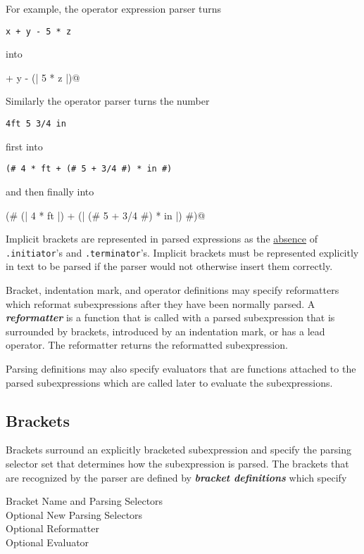 \documentclass[12pt]{article}
\newcommand{\key}[1]{{\bf \em #1}\index{#1}}
\newcommand{\skey}[2]{{\bf \em #1#2}\index{#1}}
\newenvironment{indpar}[1][0.3in]%
	{\begin{list}{}%
		     {\setlength{\itemsep}{0in}%
		      \setlength{\topsep}{0in}%
		      \setlength{\parsep}{1ex}%
		      \setlength{\labelwidth}{#1}%
		      \setlength{\leftmargin}{#1}%
		      \addtolength{\leftmargin}{\labelsep}}%
	 \item}%
	{\end{list}}
\begin{document}
For example, the operator expression parser turns
\begin{center}
\verb|x + y - 5 * z|
\end{center}
into
\begin{center}
\verb@x + y - (| 5 * z |)@
\end{center}
Similarly the operator parser turns the number
\begin{center}
\verb|4ft 5 3/4 in|
\end{center}
first into
\begin{center}
\verb|(# 4 * ft + (# 5 + 3/4 #) * in #)|
\end{center}
and then finally into
\begin{center}
\verb@(# (| 4 * ft |) + (| (# 5 + 3/4 #) * in |) #)@
\end{center}

Implicit brackets are represented in parsed expressions as the
\underline{absence} of \verb|.initiator|'s
and \verb|.terminator|'s.  Implicit brackets must be represented
explicitly in text to be parsed if the parser would not otherwise
insert them correctly.

Bracket, indentation mark, and operator
definitions may specify reformatters
which reformat subexpressions after they have been normally parsed.
A \key{reformatter}\label{REFORMATTER} is a function that
is called with a parsed subexpression that is surrounded by brackets,
introduced by an indentation mark, or has a lead operator.
The reformatter returns the reformatted subexpression.

Parsing definitions may also specify evaluators
that are functions attached to the parsed subexpressions which
are called later to evaluate the subexpressions.

\subsection{Brackets}
\label{BRACKETS}

Brackets surround an explicitly bracketed
subexpression and specify the parsing
selector set that determines how the subexpression is parsed.
The brackets that are recognized by the parser
are defined by \skey{bracket definition}s which specify

\begin{indpar}[1in]
Bracket Name and Parsing Selectors \\
Optional New Parsing Selectors \\
Optional Reformatter \\
Optional Evaluator
\end{indpar}
\end{document}
